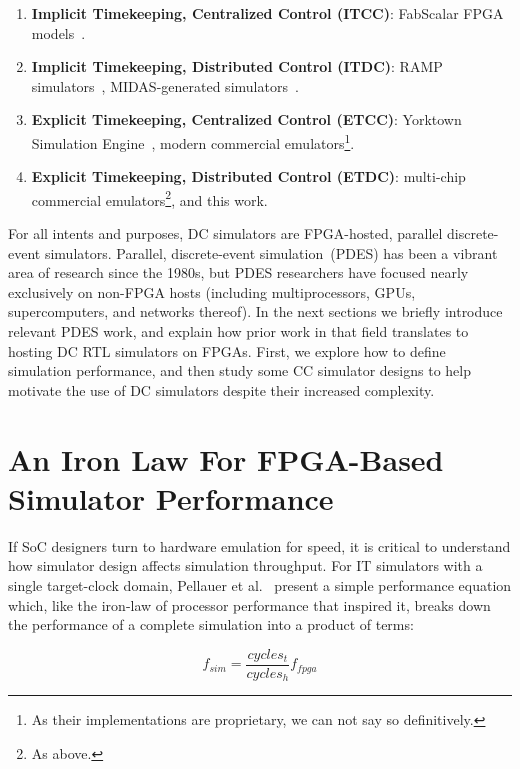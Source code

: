 \begin{enumerate}
\item\textbf{Implicit Timekeeping, Centralized Control (ITCC)}: FabScalar FPGA models~\cite{fabscalarfpga}.

\item\textbf{Implicit Timekeeping, Distributed Control (ITDC)}: RAMP simulators~\cite{RAMPGold, HASim}, MIDAS-generated simulators~\cite{FireSim}.

\item\textbf{Explicit Timekeeping, Centralized Control (ETCC)}: Yorktown Simulation Engine~\cite{YSESoftware}, modern commercial emulators\footnote{As their implementations are proprietary, we can not say so definitively.}.

\item\textbf{Explicit Timekeeping, Distributed Control (ETDC)}: multi-chip commercial emulators\footnote{As above.}, and this work.
\end{enumerate}

For all intents and purposes, DC simulators are FPGA-hosted, parallel
discrete-event simulators.  Parallel, discrete-event simulation~(PDES) has been
a vibrant area of research since the 1980s, but PDES researchers have focused
nearly exclusively on non-FPGA hosts (including multiprocessors, GPUs,
supercomputers, and networks thereof).  In the next sections we briefly introduce
relevant PDES work, and explain how prior work in that field translates to
hosting DC RTL simulators on FPGAs. First, we explore how to define simulation
performance, and then study some CC simulator designs to help motivate the use
of DC simulators despite their increased complexity.

\section{An Iron Law For FPGA-Based Simulator Performance}\label{sec:iron-law}

If SoC designers turn to hardware emulation for speed, it is critical
to understand how simulator design affects simulation throughput. For IT simulators with a single target-clock domain, Pellauer et al.~\cite{APortNetworks} present a simple performance
equation which, like the iron-law of processor performance that inspired it,
breaks down the performance of a complete simulation into a product of terms:

\begin{equation}
    f_{sim} = \frac{cycles_{t}}{cycles_{h}} f_{fpga}
\end{equation}\label{eq:sim-perf}

